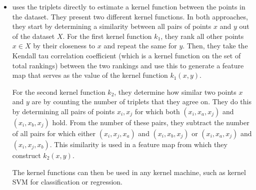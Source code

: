 \begin{itemize}



    \item %
        \cite{kleindessnerKernelFunctionsBased2017} uses the triplets directly to estimate a kernel function between the points in the dataset. 
        They present two different kernel functions. In both approaches, they start by determining a similarity between all pairs of points $x$ and $y$ out of the dataset $X$.
        For the first kernel function $k_1$, they rank all other points $x \in X$ by their closeness to $x$ and repeat the same for $y$. Then, they take 
        the Kendall tau correlation coefficient (which is a kernel function on the set of total rankings) between the two rankings and use this to generate a feature
        map that serves as the value of the kernel function $k_1(x,y)$. 

        For the second kernel function $k_2$, they determine how similar two points $x$ and $y$ are by counting the number of triplets that they agree on. 
        They do this by determining all pairs of points $x_i, x_j$ for which both $(x_i, x_a, x_j)$ and $(x_i, x_b, x_j)$ hold. From the number of these pairs, 
        they subtract the number of all pairs for which either $(x_i, x_j, x_a)$ and $(x_i, x_b, x_j)$ or $(x_i, x_a, x_j)$ and $(x_i, x_j, x_b)$. This similarity is used in 
        a feature map from which they construct $k_2(x,y)$.

        The kernel functions can then be used in any kernel machine, such as kernel SVM for classification or regression. 


\end{itemize}
